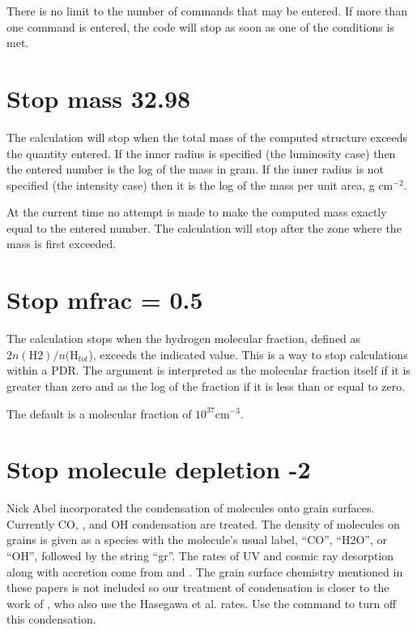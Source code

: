 There is no limit to the number of  commands that may be entered.
If more than one
 command is entered, the code
will stop as soon as one of the conditions is met.

\section{Stop mass 32.98}

The calculation will stop when the total mass of the computed structure
exceeds the quantity entered.  If the inner radius is specified (the
luminosity case) then the entered number is the log of the mass in gram.
If the inner radius is not specified (the intensity case) then it is the
log of the mass per unit area, g cm$^{-2}$.

At the current time no attempt is made to make the computed mass exactly
equal to the entered number.
The calculation will stop after the zone where
the mass is first exceeded.

\section{Stop mfrac = 0.5}

The calculation stops when the hydrogen molecular fraction, defined as
$2n(\mathrm{H}2)/n(\mathrm{H}_{tot}$), exceeds the indicated value.
This is a way to stop
calculations within a PDR.
The argument is interpreted as the molecular
fraction itself if it is greater than zero and as the log of the fraction
if it is less than or equal to zero.

The default is a molecular fraction of $10^{37} \mathrm{cm}^{-3}$.

\section{Stop molecule depletion -2}

Nick Abel incorporated the condensation of molecules onto grain surfaces.
Currently CO, \water, and OH condensation are treated.
The density of molecules
on grains is given as a species with the molecule's usual label, ``CO'',
``H2O'', or ``OH'', followed by the string ``gr''.
The rates of UV and
cosmic ray desorption along with accretion come from \citet{Hasegawa1992} and \citet{Hasegawa1993}.
The grain surface chemistry
mentioned in these papers is not included so our treatment of condensation
is closer to the work of \citet{Bergin1995}, who also use
the Hasegawa et al. rates.
Use the  command
to turn off this condensation.

